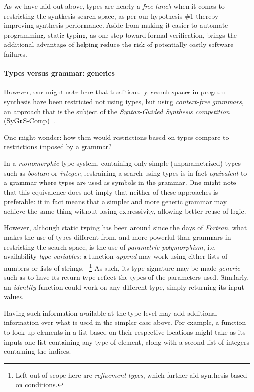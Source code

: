 \documentclass{article}
\begin{document}
As we have laid out above,
types are nearly a \emph{free lunch} when it comes to restricting the synthesis search space,
as per our hypothesis \#1
thereby improving synthesis performance.
Aside from making it easier to automate programming,
static typing, as one step toward formal verification,
brings the additional advantage of helping reduce the
risk of potentially costly software failures.%
~\citep{miller2018smart,leveson2001systemic}

\paragraph{Types versus grammar: generics} \label{sec:generics}

However, one might note here that traditionally,
search spaces in program synthesis have been restricted not using types,
but using \emph{context-free grammars},
an approach that is the subject of the
\emph{Syntax-Guided Synthesis competition} (SyGuS-Comp)~\citep{sygus}.

One might wonder: how then would restrictions based on
types compare to restrictions imposed by a grammar?

In a \emph{monomorphic} type system,
containing only simple (unparametrized) types such as \emph{boolean} or \emph{integer},
restraining a search using types is in fact \emph{equivalent}
to a grammar where types are used as symbols in the grammar.
One might note that this equivalence does not imply
that neither of these approaches is preferable:
it in fact means that a simpler and more generic grammar
may achieve the same thing without losing expressivity,
allowing better reuse of logic.

However, although static typing has been around since the days of \emph{Fortran},
what makes the use of types different from,
and more powerful than grammars in restricting the search space,
is the use of \emph{parametric polymorphism}, i.e. availability \emph{type variables}:
a function \emph{append} may work using either lists of numbers or lists of strings.%
~\footnote{Left out of scope here are \emph{refinement types}, which further aid synthesis based on conditions.}
As such, its type signature may be made \emph{generic} such as to have its return type reflect the types of the parameters used.
Similarly, an \emph{identity} function could work on any different type, simply returning its input values.

Having such information available at the type level may add additional information over what is used in the simpler case above.
For example, a function to look up elements in a list based on their respective locations might take as its inputs one list containing any type of element, along with a second list of integers containing the indices.
\end{document}
